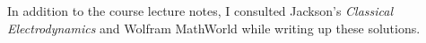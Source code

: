 \documentclass[11pt]{article}
\begin{document}


\clearpage




\vfill
In addition to the course lecture notes, I consulted Jackson's \emph{Classical Electrodynamics} and Wolfram MathWorld while writing up these solutions.
\end{document}
